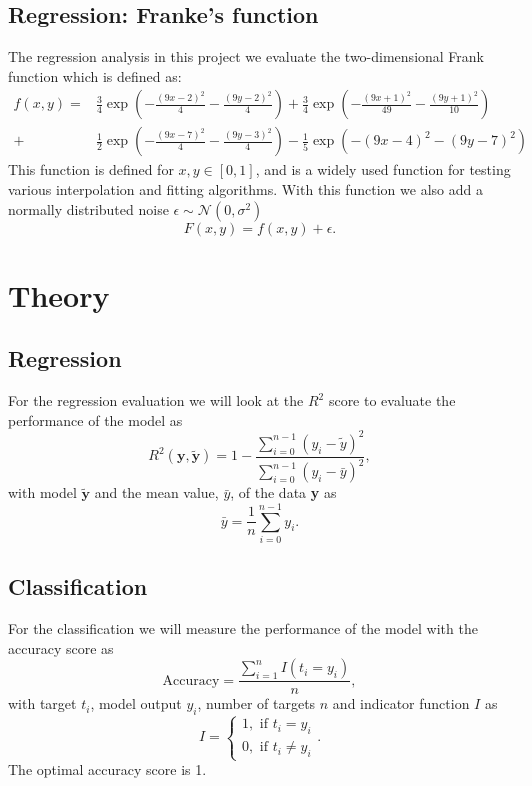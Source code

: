 \documentclass[12pt,a4paper,english]{article}
\begin{document}
\subsection{Regression: Franke's function}
\label{subsect:franke_data}
The regression analysis in this project we evaluate the two-dimensional Frank function which is defined as:
\begin{align}
\label{eq:Franke_func}
f(x,y)=&\frac{3}{4}\exp\left(-\frac{(9x-2)^2}{4}-\frac{(9y-2)^2}{4}\right)+
\frac{3}{4}\exp\left(-\frac{(9x+1)^2}{49}-\frac{(9y+1)^2}{10}\right)\\ 
+& \frac{1}{2}\exp\left(-\frac{(9x-7)^2}{4}-\frac{(9y-3)^2}{4}\right)- \frac{1}{5}\exp\left(-(9x-4)^2-(9y-7)^2\right) \nonumber
\end{align}
This function is defined for $x,y\in[0,1]$, and is a widely used function for testing various interpolation and fitting algorithms. With this function we also add a normally distributed noise $\epsilon\sim \mathcal{N}(0,\sigma^2)$
\begin{equation*}
F(x,y)=f(x,y)+\epsilon.
\end{equation*}

\section{Theory}
\label{sect:Theory}
\subsection{Regression}
\label{subsect:Regression}
For the regression evaluation we will look at the $R^2$ score to evaluate the performance of the model as
\begin{equation}
\label{eq:R2_score}
R^2(\textbf{y},\tilde{\textbf{y}})=1-\frac{\sum_{i=0}^{n-1}(y_i-\tilde{y})^2}{\sum_{i=0}^{n-1}(y_i-\bar{y})^2},
\end{equation}
with model $\tilde{\textbf{y}}$ and the mean value, $\bar{y}$, of the data \textbf{y} as
\[\bar{y}=\frac{1}{n}\sum_{i=0}^{n-1}y_i.\]

\subsection{Classification}
\label{subsect:Classification}
For the classification we will measure the performance of the model with the accuracy score as
\begin{equation}
\label{eq:accuracy_score}
\text{Accuracy}=\frac{\sum_{i=1}^{n}I(t_i=y_i)}{n},
\end{equation}
with target $t_i$, model output $y_i$, number of targets $n$ and indicator function $I$ as
\[I=\begin{cases}
1, \text{ if } t_i=y_i\\
0, \text{ if } t_i\neq y_i
\end{cases}.\]
The optimal accuracy score is 1.
\end{document}

